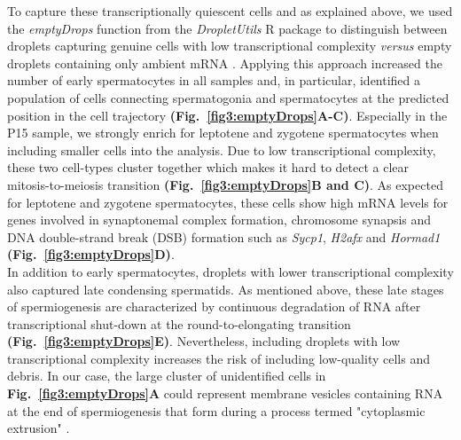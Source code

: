 To capture these transcriptionally quiescent cells and as explained above, we used the \emph{emptyDrops} function from the \emph{DropletUtils} R package to distinguish between droplets capturing genuine cells with low transcriptional complexity \emph{versus} empty droplets containing only ambient mRNA \citep{Lun2018}. Applying this approach increased the number of early spermatocytes in all samples and, in particular, identified a population of cells connecting spermatogonia and spermatocytes at the predicted position in the cell trajectory \textbf{(Fig.~\ref{fig3:emptyDrops}A-C)}. Especially in the P15 sample, we strongly enrich for leptotene and zygotene spermatocytes when including smaller cells into the analysis. Due to low transcriptional complexity, these two cell-types cluster together which makes it hard to detect a clear mitosis-to-meiosis transition \textbf{(Fig.~\ref{fig3:emptyDrops}B and C)}. As expected for leptotene and zygotene spermatocytes, these cells show high mRNA levels for genes involved in synaptonemal complex formation, chromosome synapsis and DNA double-strand break (DSB) formation such as \textit{Sycp1}, \textit{H2afx} and \textit{Hormad1} \citep{Daniel2011, Mahadevaiah2001, Vries2005} \textbf{(Fig.~\ref{fig3:emptyDrops}D)}.\\

In addition to early spermatocytes, droplets with lower transcriptional complexity also captured late condensing spermatids. As mentioned above, these late stages of spermiogenesis are characterized by continuous degradation of RNA after transcriptional shut-down at the round-to-elongating transition \citep{Steger1999} \textbf{(Fig.~\ref{fig3:emptyDrops}E)}. Nevertheless, including droplets with low transcriptional complexity increases the risk of including low-quality cells and debris. In our case, the large cluster of unidentified cells in \textbf{Fig.~\ref{fig3:emptyDrops}A} could represent membrane vesicles containing RNA at the end of spermiogenesis that form during a process termed "cytoplasmic extrusion" \citep{Rengan2012}.\\

\newpage

